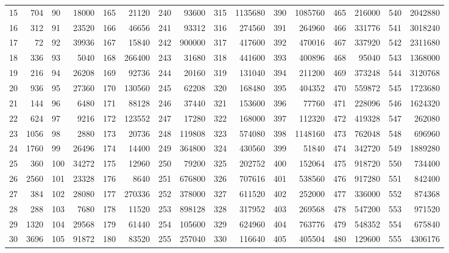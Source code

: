 \documentclass[11pt]{amsart}
\theoremstyle{remark}
\theoremstyle{plain}
\numberwithin{equation}{section}
\renewcommand{\(}{\left(}
\renewcommand{\)}{\right)}
\begin{document}
{\begin{table}
\begin{tabular}{|lr|lr|lr|lr|lr|lr|lr|lr|}
   15 & 704 &   90 & 18000 &  165 & 21120 &  240 & 93600 &  315 & 1135680 &  390 & 1085760 &  465 & 216000 &  540 & 2042880 \\
   16 & 312 &   91 & 23520 &  166 & 46656 &  241 & 93312 &  316 & 274560 &  391 & 264960 &  466 & 331776 &  541 & 3018240 \\
   17 & 72 &   92 & 39936 &  167 & 15840 &  242 & 900000 &  317 & 417600 &  392 & 470016 &  467 & 337920 &  542 & 2311680 \\
   18 & 336 &   93 & 5040 &  168 & 266400 &  243 & 31680 &  318 & 441600 &  393 & 400896 &  468 & 95040 &  543 & 1368000 \\
   19 & 216 &   94 & 26208 &  169 & 92736 &  244 & 20160 &  319 & 131040 &  394 & 211200 &  469 & 373248 &  544 & 3120768 \\
   20 & 936 &   95 & 27360 &  170 & 130560 &  245 & 62208 &  320 & 168480 &  395 & 404352 &  470 & 559872 &  545 & 1723680 \\
   21 & 144 &   96 & 6480 &  171 & 88128 &  246 & 37440 &  321 & 153600 &  396 & 77760 &  471 & 228096 &  546 & 1624320 \\
   22 & 624 &   97 & 9216 &  172 & 123552 &  247 & 17280 &  322 & 168000 &  397 & 112320 &  472 & 419328 &  547 & 262080 \\
   23 & 1056 &   98 & 2880 &  173 & 20736 &  248 & 119808 &  323 & 574080 &  398 & 1148160 &  473 & 762048 &  548 & 696960 \\
   24 & 1760 &   99 & 26496 &  174 & 14400 &  249 & 364800 &  324 & 430560 &  399 & 51840 &  474 & 342720 &  549 & 1889280 \\
   25 & 360 &  100 & 34272 &  175 & 12960 &  250 & 79200 &  325 & 202752 &  400 & 152064 &  475 & 918720 &  550 & 734400 \\
   26 & 2560 &  101 & 23328 &  176 & 8640 &  251 & 676800 &  326 & 707616 &  401 & 538560 &  476 & 917280 &  551 & 842400 \\
   27 & 384 &  102 & 28080 &  177 & 270336 &  252 & 378000 &  327 & 611520 &  402 & 252000 &  477 & 336000 &  552 & 874368 \\
   28 & 288 &  103 & 7680 &  178 & 11520 &  253 & 898128 &  328 & 317952 &  403 & 269568 &  478 & 547200 &  553 & 971520 \\
   29 & 1320 &  104 & 29568 &  179 & 61440 &  254 & 105600 &  329 & 624960 &  404 & 763776 &  479 & 548352 &  554 & 675840 \\
   30 & 3696 &  105 & 91872 &  180 & 83520 &  255 & 257040 &  330 & 116640 &  405 & 405504 &  480 & 129600 &  555 & 4306176 \\

\end{tabular}
\end{table}}
\end{document}
